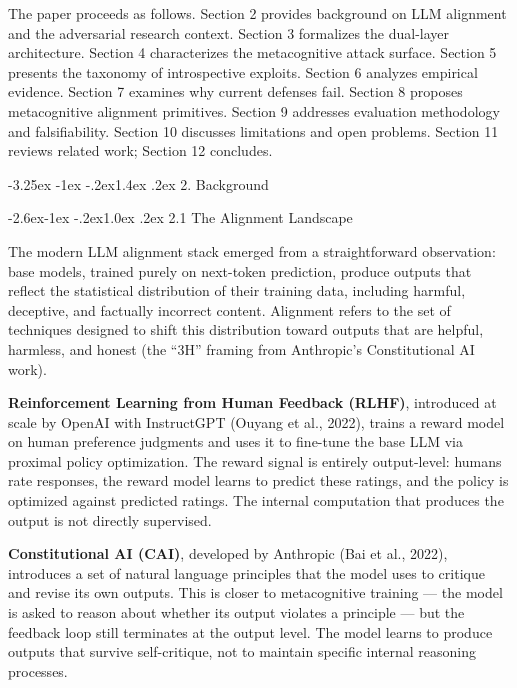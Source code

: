 \documentclass[
  11pt,
]{article}
\makeatletter
\renewcommand\section{\@startsection{section}{1}{\z@}%
  {-3.25ex \@plus -1ex \@minus -.2ex}{1.4ex \@plus.2ex}%
  {\normalfont\sffamily\Large\bfseries}}
\renewcommand\subsection{\@startsection{subsection}{2}{\z@}%
  {-2.6ex\@plus -1ex \@minus -.2ex}{1.0ex \@plus .2ex}%
  {\normalfont\sffamily\large\bfseries}}
\makeatother
\begin{document}
The paper proceeds as follows. Section 2 provides background on LLM
alignment and the adversarial research context. Section 3 formalizes the
dual-layer architecture. Section 4 characterizes the metacognitive
attack surface. Section 5 presents the taxonomy of introspective
exploits. Section 6 analyzes empirical evidence. Section 7 examines why
current defenses fail. Section 8 proposes metacognitive alignment
primitives. Section 9 addresses evaluation methodology and
falsifiability. Section 10 discusses limitations and open problems.
Section 11 reviews related work; Section 12 concludes.

\section{2. Background}\label{background}

\subsection{2.1 The Alignment Landscape}\label{the-alignment-landscape}

The modern LLM alignment stack emerged from a straightforward
observation: base models, trained purely on next-token prediction,
produce outputs that reflect the statistical distribution of their
training data, including harmful, deceptive, and factually incorrect
content. Alignment refers to the set of techniques designed to shift
this distribution toward outputs that are helpful, harmless, and honest
(the ``3H'' framing from Anthropic's Constitutional AI work).

\textbf{Reinforcement Learning from Human Feedback (RLHF)}, introduced
at scale by OpenAI with InstructGPT (Ouyang et al., 2022), trains a
reward model on human preference judgments and uses it to fine-tune the
base LLM via proximal policy optimization. The reward signal is entirely
output-level: humans rate responses, the reward model learns to predict
these ratings, and the policy is optimized against predicted ratings.
The internal computation that produces the output is not directly
supervised.

\textbf{Constitutional AI (CAI)}, developed by Anthropic (Bai et al.,
2022), introduces a set of natural language principles that the model
uses to critique and revise its own outputs. This is closer to
metacognitive training --- the model is asked to reason about whether
its output violates a principle --- but the feedback loop still
terminates at the output level. The model learns to produce outputs that
survive self-critique, not to maintain specific internal reasoning
processes.
\end{document}
